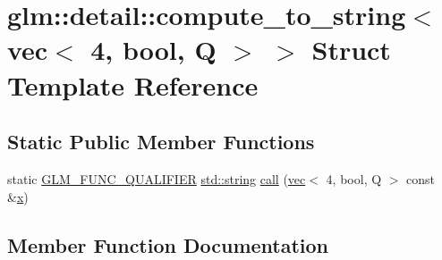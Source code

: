 \hypertarget{structglm_1_1detail_1_1compute__to__string_3_01vec_3_014_00_01bool_00_01_q_01_4_01_4}{}\section{glm\+:\+:detail\+:\+:compute\+\_\+to\+\_\+string$<$ vec$<$ 4, bool, Q $>$ $>$ Struct Template Reference}
\label{structglm_1_1detail_1_1compute__to__string_3_01vec_3_014_00_01bool_00_01_q_01_4_01_4}
\subsection*{Static Public Member Functions}
\begin{DoxyCompactItemize}
\item 
static \hyperlink{setup_8hpp_a33fdea6f91c5f834105f7415e2a64407}{G\+L\+M\+\_\+\+F\+U\+N\+C\+\_\+\+Q\+U\+A\+L\+I\+F\+I\+ER} \hyperlink{_s_d_l__opengl__glext_8h_ae84541b4f3d8e1ea24ec0f466a8c568b}{std\+::string} \hyperlink{structglm_1_1detail_1_1compute__to__string_3_01vec_3_014_00_01bool_00_01_q_01_4_01_4_acc9ef66b31a0aaa989ee98614e340e27}{call} (\hyperlink{structglm_1_1vec}{vec}$<$ 4, bool, Q $>$ const \&\hyperlink{_s_d_l__opengl_8h_ad0e63d0edcdbd3d79554076bf309fd47}{x})
\end{DoxyCompactItemize}


\subsection{Member Function Documentation}
\mbox{\label{structglm_1_1detail_1_1compute__to__string_3_01vec_3_014_00_01bool_00_01_q_01_4_01_4_acc9ef66b31a0aaa989ee98614e340e27}} 
